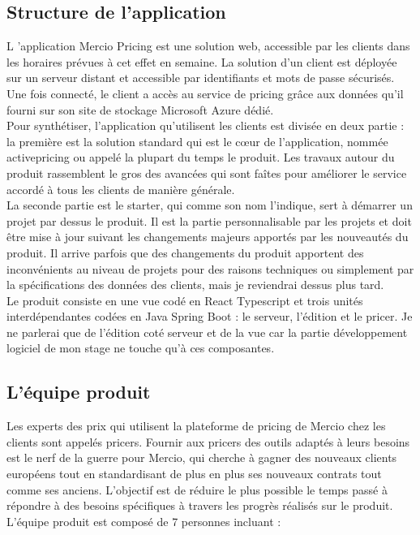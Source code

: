 \documentclass{rapportCS}
\begin{document}
\subsection{Structure de l'application}
	L 'application Mercio Pricing est une solution web, accessible par les clients dans les horaires 
	prévues à cet effet en semaine. La solution d'un client est déployée sur un serveur distant et 
	accessible par identifiants et mots de passe sécurisés.\\
	Une fois connecté, le client a accès au service de pricing grâce aux données qu'il fourni sur son 
	site de stockage Microsoft Azure dédié.\\
	Pour synthétiser, l'application qu'utilisent les clients est divisée en deux partie : 
	la première est la solution standard qui est le cœur de l'application, nommée activepricing ou 
	appelé la plupart du temps le produit. Les travaux autour du produit rassemblent le gros des avancées 
	qui sont faîtes pour améliorer le service accordé à tous les clients de manière générale.\\
	La seconde partie est le starter, qui comme son nom l'indique, sert à démarrer un projet par 
	dessus le produit. Il est la partie personnalisable par les projets et doit être mise à jour suivant
	les changements majeurs apportés par les nouveautés du produit. Il arrive parfois que des 
	changements du produit apportent des inconvénients au niveau de projets pour des raisons techniques
	ou simplement par la spécifications des données des clients, mais je reviendrai dessus plus tard.\\
	Le produit consiste en une vue codé en React Typescript et trois unités interdépendantes codées
	en Java Spring Boot : le serveur, l'édition et le pricer. Je ne parlerai que de l'édition  coté
	serveur et de la vue car la partie développement logiciel de mon stage ne touche qu'à 
	ces composantes.\\

\subsection{ L'équipe produit }
	Les experts des prix qui utilisent la plateforme de pricing de Mercio chez les clients sont appelés 
	pricers. Fournir aux pricers des outils adaptés à leurs besoins est le nerf de la guerre pour 
	Mercio, qui cherche à gagner des nouveaux clients européens tout en standardisant de plus 
	en plus ses nouveaux contrats tout comme ses anciens. 
	L'objectif est de réduire le plus possible le temps passé à répondre à des besoins spécifiques 
	à travers les progrès réalisés sur le produit.\\
	L'équipe produit est composé de 7 personnes incluant :\\
	
\end{document}
